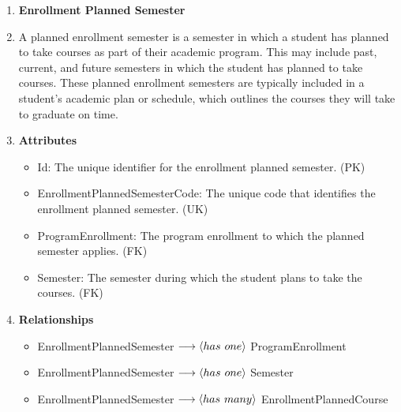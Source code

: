 \documentclass[12pt]{article}
\begin{document}
\begin{appendices}
\begin{enumerate}[label=(\roman*)]
    \item \textbf{Enrollment Planned Semester}
    \item[] A planned enrollment semester is a semester in which a student has planned to take courses as part of their academic program. This may include past, current, and future semesters in which the student has planned to take courses. These planned enrollment semesters are typically included in a student's academic plan or schedule, which outlines the courses they will take to graduate on time.
    \item[] \textbf{Attributes}
    \begin{itemize}
        \item Id: The unique identifier for the enrollment planned semester. (PK)
        \item EnrollmentPlannedSemesterCode: The unique code that identifies the enrollment planned semester. (UK)
        \item ProgramEnrollment: The program enrollment to which the planned semester applies. (FK)
        \item Semester: The semester during which the student plans to take the courses. (FK)
    \end{itemize}
    \item[] \textbf{Relationships}
    \begin{itemize}
        \item EnrollmentPlannedSemester $ \longrightarrow \langle has \hspace{0.125cm} one \rangle $ ProgramEnrollment
        \item EnrollmentPlannedSemester $ \longrightarrow \langle has \hspace{0.125cm} one \rangle $ Semester
        \item EnrollmentPlannedSemester $ \longrightarrow \langle has \hspace{0.125cm} many \rangle $ EnrollmentPlannedCourse
    \end{itemize}


\end{enumerate}
\end{appendices}
\end{document}
